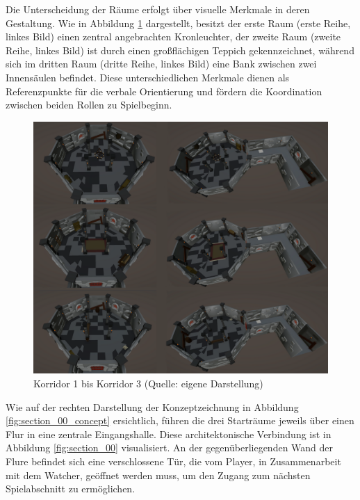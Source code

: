 Die Unterscheidung der Räume erfolgt über visuelle Merkmale in deren Gestaltung. Wie in Abbildung \ref{fig:corridors} dargestellt, besitzt der erste Raum (erste Reihe, linkes Bild) einen zentral angebrachten Kronleuchter, der zweite Raum (zweite Reihe, linkes Bild) ist durch einen großflächigen Teppich gekennzeichnet, während sich im dritten Raum (dritte Reihe, linkes Bild) eine Bank zwischen zwei Innensäulen befindet. Diese unterschiedlichen Merkmale dienen als Referenzpunkte für die verbale Orientierung und fördern die Koordination zwischen beiden Rollen zu Spielbeginn.

\begin{figure}[ht]
\centering
\includegraphics[width=1\linewidth]{content/pictures/Room_00-Room_02-Corridor_00-Corridor_02.png}
\caption{Korridor 1 bis Korridor 3 (Quelle: eigene Darstellung)}
\label{fig:corridors}
\end{figure}

Wie auf der rechten Darstellung der Konzeptzeichnung in Abbildung \ref{fig:section_00_concept} ersichtlich, führen die drei Starträume jeweils über einen Flur in eine zentrale Eingangshalle. Diese architektonische Verbindung ist in Abbildung \ref{fig:section_00} visualisiert. An der gegenüberliegenden Wand der Flure befindet sich eine verschlossene Tür, die vom Player, in Zusammenarbeit mit dem Watcher, geöffnet werden muss, um den Zugang zum nächsten Spielabschnitt zu ermöglichen.

